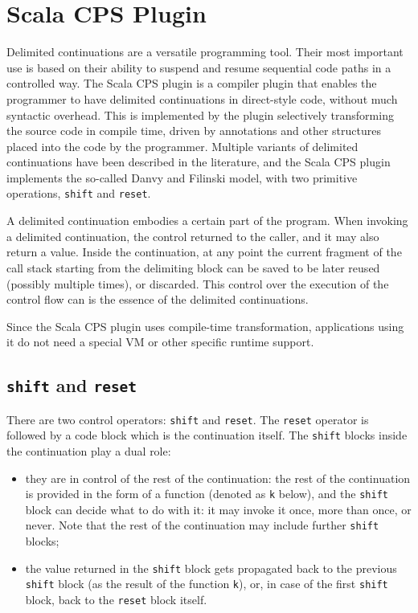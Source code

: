 \section{Scala CPS Plugin}

Delimited continuations are a versatile programming tool. Their most important use is based on their ability to suspend and resume sequential code paths in a controlled way. The Scala CPS plugin is a compiler plugin that enables the programmer to have delimited continuations in direct-style code, without much syntactic overhead. This is implemented by the plugin selectively transforming the source code in compile time, driven by annotations and other structures placed into the code by the programmer. Multiple variants of delimited continuations have been described in the literature, and the Scala CPS plugin implements the so-called Danvy and Filinski model, with two primitive operations, \texttt{shift} and \texttt{reset}.

A delimited continuation embodies a certain part of the program. When invoking a delimited continuation, the control returned to the caller, and it may also return a value. Inside the continuation, at any point the current fragment of the call stack starting from the delimiting block can be saved to be later reused (possibly multiple times), or discarded. This control over the execution of the control flow can is the essence of the delimited continuations.

Since the Scala CPS plugin uses compile-time transformation, applications using it do not need a special VM or other specific runtime support.

\subsection{\texttt{shift} and \texttt{reset}}

There are two control operators: \texttt{shift} and \texttt{reset}. The \texttt{reset} operator is followed by a code block which is the continuation itself. The \texttt{shift} blocks inside the continuation play a dual role: 
\begin{itemize}
\item they are in control of the rest of the continuation: the rest of the continuation is provided in the form of a function (denoted as \texttt{k} below), and the \texttt{shift} block can decide what to do with it: it may invoke it once, more than once, or never. Note that the rest of the continuation may include further \texttt{shift} blocks;
\item the value returned in the \texttt{shift} block gets propagated back to the previous \texttt{shift} block (as the result of the function \texttt{k}), or, in case of the first \texttt{shift} block, back to the \texttt{reset} block itself.
\end{itemize}

